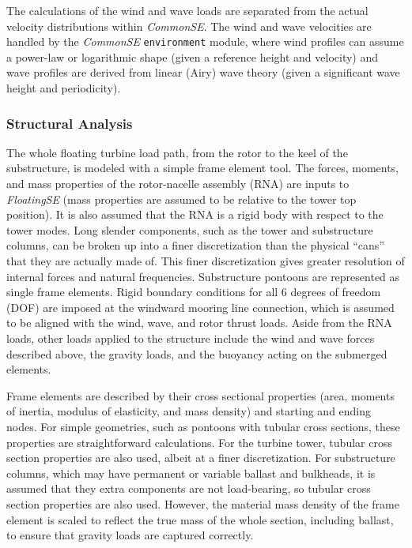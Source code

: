The calculations of the wind and wave loads are separated from the
actual velocity distributions within \textit{CommonSE}.  The wind and wave
velocities are handled by the \textit{CommonSE} \texttt{environment} module,
where wind profiles can assume a power-law or logarithmic shape (given a
reference height and velocity) and wave profiles are derived from linear
(Airy) wave theory (given a significant wave height and periodicity).

\subsubsection{Structural Analysis}
The whole floating turbine load path, from the rotor to the keel of the
substructure, is modeled with a simple frame element tool.  The forces,
moments, and mass properties of the rotor-nacelle assembly (RNA) are
inputs to \textit{FloatingSE} (mass properties are assumed to be relative to the
tower top position).  It is also assumed that the RNA is a rigid body
with respect to the tower modes.  Long slender components, such as the
tower and substructure columns, can be broken up into a finer
discretization than the physical ``cans'' that they are actually made
of.  This finer discretization gives greater resolution of internal
forces and natural frequencies.  Substructure pontoons are represented
as single frame elements.  Rigid boundary conditions for all 6 degrees
of freedom (DOF) are imposed at the windward mooring line connection,
which is assumed to be aligned with the wind, wave, and rotor thrust
loads.  Aside from the RNA loads, other loads applied to the structure
include the wind and wave forces described above, the gravity loads, and
the buoyancy acting on the submerged elements.

Frame elements are described by their cross sectional properties (area,
moments of inertia, modulus of elasticity, and mass density) and
starting and ending nodes.  For simple geometries, such as pontoons with
tubular cross sections, these properties are straightforward
calculations.  For the turbine tower, tubular cross section properties
are also used, albeit at a finer discretization.  For substructure
columns, which may have permanent or variable ballast and bulkheads,
it is assumed that they extra components are not load-bearing, so
tubular cross section properties are also used.  However, the material mass
density of the frame element is scaled to reflect the true mass of the
whole section, including ballast, to ensure that gravity loads are
captured correctly.

